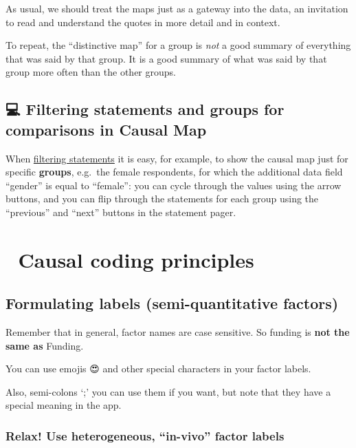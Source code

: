 \documentclass[
]{book}
\begin{document}
As usual, we should treat the maps just as a gateway into the data, an invitation to read and understand the quotes in more detail and in context.

To repeat, the ``distinctive map'' for a group is \emph{not} a good summary of everything that was said by that group. It is a good summary of what was said by that group more often than the other groups.

\hypertarget{filtering-statements-and-groups-for-comparisons-in-causal-map}{%
\section{💻 Filtering statements and groups for comparisons in Causal Map}\label{filtering-statements-and-groups-for-comparisons-in-causal-map}}

When \protect\hyperlink{filtering-the-map-by-statement-source-question}{filtering statements} it is easy, for example, to show the causal map just for specific \textbf{groups}, e.g.~the female respondents, for which the additional data field ``gender'' is equal to ``female'': you can cycle through the values using the arrow buttons, and you can flip through the statements for each group using the ``previous'' and ``next'' buttons in the statement pager.

\hypertarget{causal-coding-principles}{%
\chapter{🧠 Causal coding principles}\label{causal-coding-principles}}

\hypertarget{formulating-labels-semi-quantitative-factors}{%
\section{Formulating labels (semi-quantitative factors)}\label{formulating-labels-semi-quantitative-factors}}

Remember that in general, factor names are case sensitive. So funding is \textbf{not the same as} Funding.

You can use emojis 😍 and other special characters in your factor labels.

Also, semi-colons `;' you can use them if you want, but note that they have a special meaning in the app.

\hypertarget{relax-use-heterogeneous-in-vivo-factor-labels}{%
\subsection{Relax! Use heterogeneous, ``in-vivo'' factor labels}\label{relax-use-heterogeneous-in-vivo-factor-labels}}
\end{document}
